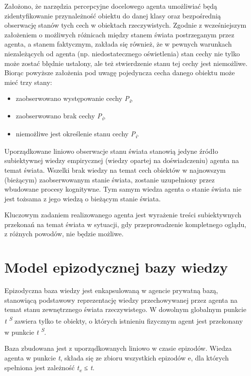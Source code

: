 	Założono, że narzędzia percepcyjne docelowego agenta umożliwiać będą zidentyfikowanie przynależność obiektu do danej klasy oraz bezpośrednią obserwację stanów tych cech w obiektach rzeczywistych. Zgodnie 
	z wcześniejszym założeniem o możliwych różnicach między stanem świata postrzeganym przez agenta, a stanem faktycznym, zakłada się również, że w pewnych warunkach niezależących od agenta (np. niedostatecznego oświetlenia) stan cechy nie tylko może zostać błędnie ustalony, ale też stwierdzenie stanu tej cechy jest niemożliwe. Biorąc powyższe założenia pod uwagę pojedyncza cecha danego obiektu może mieć trzy stany: 

	\begin{itemize}
	 	\setlength{\itemindent}{.5in}
		\item zaobserwowano występowanie cechy \textit{P\textsubscript{i}},
		\item zaobserwowano brak cechy \textit{P\textsubscript{i}},
		\item niemożliwe jest określenie stanu cechy
			\textit{P\textsubscript{i}}.
	\end{itemize}
	
	Uporządkowane liniowo obserwacje stanu świata stanowią jedyne źródło subiektywnej wiedzy empirycznej (wiedzy opartej na doświadczeniu) agenta na temat świata. Wszelki brak wiedzy na temat cech obiektów w najnowszym (bieżącym) zaobserwowanym stanie świata, zostanie uzupełniony przez wbudowane procesy kognitywne. Tym samym wiedza agenta o stanie świata nie jest tożsama z jego wiedzą o bieżącym stanie świata.
	
	Kluczowym zadaniem realizowanego agenta jest wyrażenie treści subiektywnych przekonań na temat świata w sytuacji, gdy przeprowadzenie kompletnego oglądu, z różnych powodów, nie będzie możliwe.
	

\section{Model epizodycznej bazy wiedzy}

Epizodyczna baza wiedzy jest enkapsulowaną w agencie prywatną bazą, stanowiącą podstawowy reprezentację wiedzy przechowywanej przez agenta na temat stanu zewnętrznego świata rzeczywistego. W dowolnym globalnym punkcie 
\textit{t\textsuperscript{ S}} 
zawiera tylko te obiekty, o których istnieniu fizycznym agent jest przekonany w punkcie 
\textit{t\textsuperscript{ S}}.

Baza zbudowana jest z uporządkowanych liniowo w czasie epizodów. Wiedza agenta w punkcie \textit{t}, składa się ze zbioru wszystkich epizodów e, dla których spełniona jest zależność \textit{t\textsubscript{e} ≤ t}.

